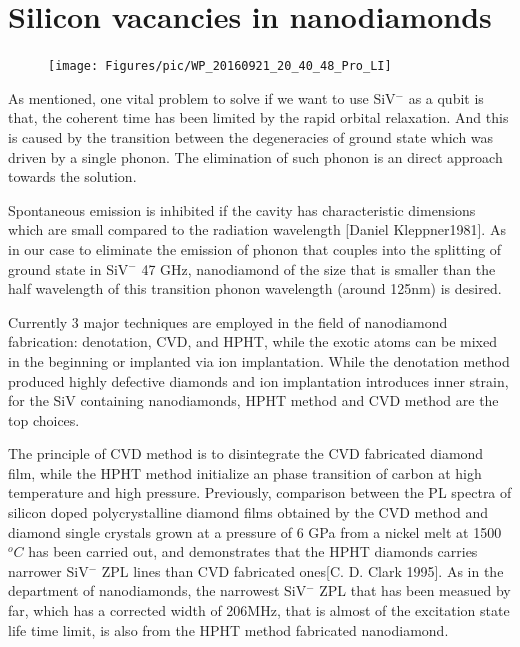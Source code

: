 
\section[Silicon vacancies in nanodiamonds]{Silicon vacancies in nanodiamonds}
\begin{figure}[h]
\centering
\texttt{[image: Figures/pic/WP\_20160921\_20\_40\_48\_Pro\_LI]}
\caption{}
\label{fig:wp20160921204048proli}
\end{figure}
As mentioned, one vital problem to solve if we want to use SiV$^{-}$ as a qubit is that, the coherent time has been limited by the rapid orbital relaxation. And this is caused by the transition between the degeneracies of ground state which was driven by a single phonon. The elimination of such phonon is an direct approach towards the solution.

Spontaneous emission is inhibited if the cavity has characteristic dimensions which are small compared to the radiation wavelength [Daniel Kleppner1981]. As in our case to eliminate the emission of phonon that couples into the splitting of ground state in SiV$^{-}$ 47 GHz, nanodiamond of the size that is smaller than the half wavelength of this transition phonon wavelength (around 125nm) is desired. 

Currently 3 major techniques are employed in the field of nanodiamond fabrication: denotation, CVD, and HPHT, while the exotic atoms can be mixed in the beginning or implanted via ion implantation. While the denotation method produced highly defective diamonds and ion implantation introduces inner strain, for the SiV containing nanodiamonds, HPHT method and CVD method are the top choices.

The principle of CVD method is to disintegrate the CVD fabricated diamond film, while the HPHT method initialize an phase transition of carbon at high temperature and high pressure. Previously, comparison between the PL spectra of silicon doped polycrystalline diamond films obtained by the CVD method and diamond single crystals grown at a pressure of 6 GPa from a nickel melt at 1500$^{o}C$ has been carried out, and demonstrates that the HPHT diamonds carries narrower SiV$^{-}$ ZPL lines than CVD fabricated ones[C. D. Clark 1995]. As in the department of nanodiamonds, the narrowest SiV$^{-}$ ZPL that has been measued by far, which has a corrected width of 206MHz, that is almost of the excitation state life time limit, is also from the HPHT method fabricated nanodiamond.

